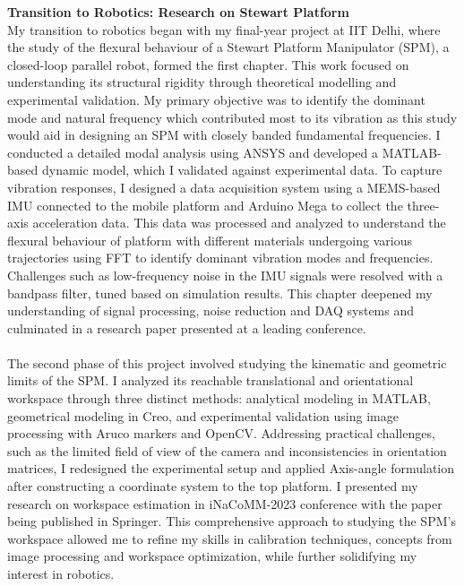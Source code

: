 \documentclass[10pt]{article}
\begin{document}
\textbf{Transition to Robotics: Research on Stewart Platform }\\
My transition to robotics began with my final-year project at IIT Delhi, where the study of the flexural behaviour of a Stewart Platform Manipulator (SPM), a closed-loop parallel robot, formed the first chapter. This work focused on understanding its structural rigidity through theoretical modelling and experimental validation. My primary objective was to identify the dominant mode and natural frequency which contributed most to its vibration as this study would aid in designing an SPM with closely banded fundamental frequencies. I conducted a detailed modal analysis using ANSYS and developed a MATLAB-based dynamic model, which I validated against experimental data. To capture vibration responses, I designed a data acquisition system using a MEMS-based IMU connected to the mobile platform and Arduino Mega to collect the three-axis acceleration data. This data was processed and analyzed to understand the flexural behaviour of platform with different materials undergoing various trajectories using FFT to identify dominant vibration modes and frequencies. Challenges such as low-frequency noise in the IMU signals were resolved with a bandpass filter, tuned based on simulation results. This chapter deepened my understanding of signal processing, noise reduction and DAQ systems and culminated in a research paper presented at a leading conference\cite{air}. \\ \\ The second phase of this project involved studying the kinematic and geometric limits of the SPM. I analyzed its reachable translational and orientational workspace through three distinct methods: analytical modeling in MATLAB, geometrical modeling in Creo, and experimental validation using image processing with Aruco markers and OpenCV. Addressing practical challenges, such as the limited field of view of the camera and inconsistencies in orientation matrices, I redesigned the experimental setup and applied Axis-angle formulation after constructing a coordinate system to the top platform. I presented my research on workspace estimation in iNaCoMM-2023 conference with the paper being published in Springer\cite{inac}. This comprehensive approach to studying the SPM’s workspace allowed me to refine my skills in calibration techniques, concepts from image processing and workspace optimization, while further solidifying my interest in robotics. \\ \\
\end{document}
